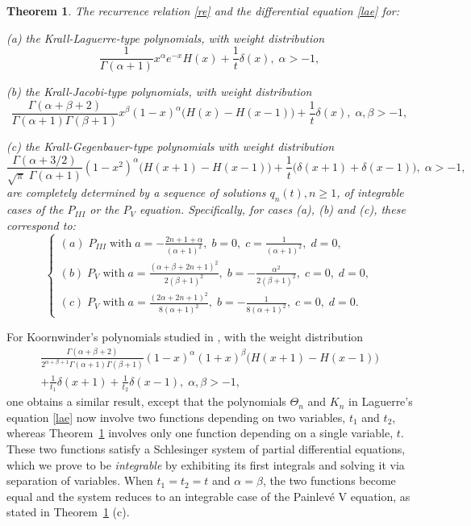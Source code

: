 \documentclass[10pt, reqno]{amsart}
\numberwithin{equation}{section}
\newtheorem{theorem}{Theorem}[section]
\numberwithin{equation}{section}
\begin{document}
\begin{theorem} \label{theorem 1.1}
The recurrence relation \eqref{re} and the differential equation \eqref{lae} for:

(a) the Krall-Laguerre-type polynomials, with weight distribution
\begin{equation}
\frac{1}{\Gamma(\alpha+1)}x^{\alpha}e^{-x}H(x)+\frac{1}{t}\delta (x),\;\alpha>-1,\label{wdKLa}
\end{equation}

(b) the Krall-Jacobi-type polynomials, with weight distribution
\begin{equation}
\frac{\Gamma(\alpha+\beta+2)}{\Gamma(\alpha+1)\Gamma(\beta+1)}x^{\beta}(1-x)^{\alpha}\big(H(x)-H(x-1)\big)+\frac{1}{t} \delta(x),\;\alpha,\beta>-1,\label{wdKJ}
\end{equation}

(c) the Krall-Gegenbauer-type polynomials with weight distribution
\begin{equation} 
\frac{\Gamma(\alpha+3/2)}{\sqrt{\pi}\;\Gamma(\alpha+1)}(1-x^2)^{\alpha}\big(H(x+1)-H(x-1)\big)
+\frac{1}{t}\big(\delta(x+1)+\delta(x-1)\big),\; \alpha>-1,\label{wdKG}
\end{equation}
are completely determined by a sequence of solutions $q_n(t), n\geq 1$, of integrable cases of the $P_{III}$ or the $P_V$ equation. Specifically, for cases (a), (b) and (c), these correspond to:
\begin{equation*}
\begin{cases}
(a)\;P_{III}\;\mbox{with}\;a=-\frac{2n+1+\alpha}{(\alpha+1)^2},\;b=0,\;c=\frac{1}{(\alpha+1)^2},\;d=0,\\
(b)\;P_V\;\mbox{with}\;a=\frac{(\alpha+\beta+2n+1)^2}{2(\beta+1)^2},\;b=-\frac{\alpha^2}{2(\beta+1)^2},\;c=0,\;d=0,\\
(c)\;P_V\;\mbox{with}\;a=\frac{(2\alpha+2n+1)^2}{8(\alpha+1)^2},\;b=-\frac{1}{8(\alpha+1)^2},\;c=0,\;d=0.
\end{cases}
\end{equation*}
\end{theorem}

For Koornwinder's polynomials studied in \cite{Ko}, with the weight distribution
\begin{multline}
\frac{\Gamma(\alpha+\beta+2)}{2^{\alpha+\beta+1}\Gamma(\alpha+1)\Gamma(\beta+1)}(1-x)^{\alpha}(1+x)^{\beta}\big(H(x+1)-H(x-1)\big)\\
+\frac{1}{t_1}\delta(x+1)+\frac{1}{t_2}\delta(x-1),\; \alpha, \beta>-1,\label{wdK}
\end{multline}
one obtains a similar result, except that the polynomials $\Theta_n$ and $K_n$ in Laguerre's equation \eqref{lae} now involve two functions depending on two variables, $t_1$ and $t_2$, whereas Theorem~\ref{theorem 1.1} involves only one function depending on a single variable,  $t$. These two functions satisfy a Schlesinger system of partial differential equations, which we prove to be \emph{integrable} by exhibiting its first integrals and solving it via separation of variables. When $t_1=t_2=t$ and $\alpha=\beta$, the two functions become equal and the system reduces to an integrable case of the Painlevé V equation, as stated in Theorem~\ref{theorem 1.1} (c).
\end{document}
